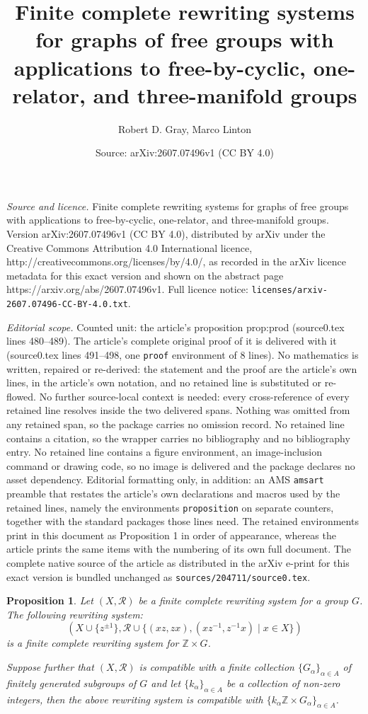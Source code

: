 \documentclass[10pt,a4paper]{amsart}
\title{Finite complete rewriting systems for graphs of free groups with applications to free-by-cyclic, one-relator, and three-manifold groups}
\author{Robert D. Gray, Marco Linton}
\date{Source: arXiv:2607.07496v1 (CC BY 4.0)}
\newtheorem{proposition}{Proposition}
\newcommand{\Z}{\mathbb{Z}}
\begin{document}
\maketitle

\noindent\emph{Source and licence.} Finite complete rewriting systems for graphs of free groups with applications to free-by-cyclic, one-relator, and three-manifold groups. Version arXiv:2607.07496v1 (CC BY 4.0), distributed by arXiv under the Creative Commons Attribution 4.0 International licence, http://creativecommons.org/licenses/by/4.0/, as recorded in the arXiv licence metadata for this exact version and shown on the abstract page https://arxiv.org/abs/2607.07496v1. Full licence notice: \texttt{licenses/arxiv-2607.07496-CC-BY-4.0.txt}.\par\smallskip

\noindent\textit{Editorial scope.} Counted unit: the article's proposition prop:prod (source0.tex lines 480--489). The article's complete original proof of it is delivered with it (source0.tex lines 491--498, one \texttt{proof} environment of 8 lines). No mathematics is written, repaired or re-derived: the statement and the proof are the article's own lines, in the article's own notation, and no retained line is substituted or re-flowed.  No further source-local context is needed: every cross-reference of every retained line resolves inside the two delivered spans.  Nothing was omitted from any retained span, so the package carries no omission record.  No retained line contains a citation, so the wrapper carries no bibliography and no bibliography entry.  No retained line contains a figure environment, an image-inclusion command or drawing code, so no image is delivered and the package declares no asset dependency.  Editorial formatting only, in addition: an AMS \texttt{amsart} preamble that restates the article's own declarations and macros used by the retained lines, namely the environments \texttt{proposition} on separate counters, together with the standard packages those lines need.  The retained environments print in this document as Proposition 1 in order of appearance, whereas the article prints the same items with the numbering of its own full document.  The complete native source of the article as distributed in the arXiv e-print for this exact version is bundled unchanged as \texttt{sources/204711/source0.tex}.
\begin{proposition}
\label{prop:prod}
Let $(X, \mathcal{R})$ be a finite complete rewriting system for a group $G$. The following rewriting system:
\[
(X\cup \{z^{\pm1}\}, \mathcal{R}\cup \{(xz, zx), (xz^{-1}, z^{-1}x) \mid x\in X\})
\] 
is a finite complete rewriting system for $\Z\times G$. 

Suppose further that $(X, \mathcal{R})$ is compatible with a finite collection $\{G_{\alpha}\}_{\alpha\in A}$ of finitely generated subgroups of $G$ and let $\{k_{\alpha}\}_{\alpha\in A}$ be a collection of non-zero integers, then the above rewriting system is compatible with $\{k_{\alpha}\Z\times G_{\alpha}\}_{\alpha\in A}$.
\end{proposition}
\end{document}
